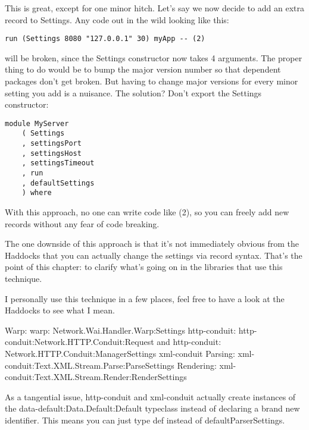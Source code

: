 This is great, except for one minor hitch. Let's say we now decide to add an extra record to
Settings. Any code out in the wild looking like this:
\begin{lstlisting}
run (Settings 8080 "127.0.0.1" 30) myApp -- (2)
\end{lstlisting}
will be broken, since the Settings constructor now takes 4 arguments. The proper
thing to do would be to bump the major version number so that dependent packages don't get
broken. But having to change major versions for every minor setting you add is a nuisance. The
solution? Don't export the Settings constructor:
\begin{lstlisting}
module MyServer
    ( Settings
    , settingsPort
    , settingsHost
    , settingsTimeout
    , run
    , defaultSettings
    ) where
\end{lstlisting}

With this approach, no one can write code like (2), so you can freely add new records without
any fear of code breaking.

The one downside of this approach is that it's not immediately obvious from the Haddocks that
you can actually change the settings via record syntax. That's the point of this chapter: to
clarify what's going on in the libraries that use this technique.

I personally use this technique in a few places, feel free to have a look at the Haddocks to
see what I mean.


Warp:
  warp:   Network.Wai.Handler.Warp:Settings
  http-conduit: http-conduit:Network.HTTP.Conduit:Request and
  http-conduit: Network.HTTP.Conduit:ManagerSettings
  xml-conduit   Parsing: xml-conduit:Text.XML.Stream.Parse:ParseSettings
Rendering:
  xml-conduit:Text.XML.Stream.Render:RenderSettings

As a tangential issue, http-conduit and xml-conduit actually
create instances of the data-default:Data.Default:Default typeclass instead of
declaring a brand new identifier. This means you can just type def instead of
defaultParserSettings.
